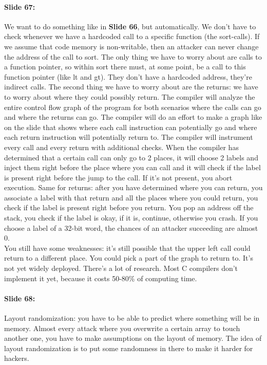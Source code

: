 \documentclass[10pt,a4paper]{report}
\begin{document}
\paragraph{Slide 67:} We want to do something like in \textbf{Slide 66}, but automatically. We don't have to check whenever we have a hardcoded call to a specific function (the sort-calls). If we assume that code memory is non-writable, then an attacker can never change the address of the call to sort. The only thing we have to worry about are calls to a function pointer, so within sort there must, at some point, be a call to this function pointer (like lt and gt). They don’t have a hardcoded address, they're indirect calls. The second thing we have to worry about are the returns: we have to worry about where they could possibly return. The compiler will analyze the entire control flow graph of the program for both scenarios where the calls can go and where the returns can go. The compiler will do an effort to make a graph like on the slide that shows where each call instruction can potentially go and where each return instruction will potentially return to. The compiler will instrument every call and every return with additional checks. When the compiler has determined that a certain call can only go to 2 places, it will choose 2 labels and inject them right before the place where you can call and it will check if the label is present right before the jump to the call. If it's not present, you abort execution. Same for returns: after you have determined where you can return, you associate a label with that return and all the places where you could return, you check if the label is present right before you return. You pop an address off the stack, you check if the label is okay, if it is, continue, otherwise you crash. If you choose a label of a 32-bit word, the chances of an attacker succeeding are almost 0.\\
You still have some weaknesses: it's still possible that the upper left call could return to a different place. You could pick a part of the graph to return to. It's not yet widely deployed. There's a lot of research. Most C compilers don't implement it yet, because it costs 50-80\% of computing time.

\paragraph{Slide 68:} Layout randomization: you have to be able to predict where something will be in memory. Almost every attack where you overwrite a certain array to touch another one, you have to make assumptions on the layout of memory. The idea of layout randomization is to put some randomness in there to make it harder for hackers.
\end{document}
